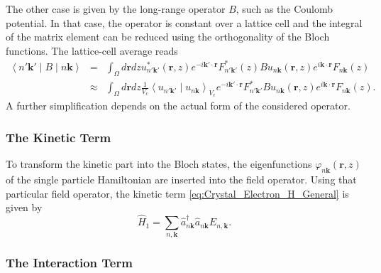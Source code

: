 The other case is given by the long-range operator $B$, such as the
Coulomb potential. In that case, the operator is constant over a lattice
cell and the integral of the matrix element can be reduced using the
orthogonality of the Bloch functions. The lattice-cell average reads\begin{eqnarray}
\left\langle n'\mathbf{k}'\mid B\mid n\mathbf{k}\right\rangle  & = & \int_{\Omega}d\mathbf{r}dzu_{n'\mathbf{k}'}^{*}(\mathbf{r},z)e^{-i\mathbf{k}'\cdot\mathbf{r}}F_{n'\mathbf{k}'}^{*}(z)Bu_{n\mathbf{k}}(\mathbf{r},z)e^{i\mathbf{k}\cdot\mathbf{r}}F_{n\mathbf{k}}(z)\nonumber \\
 & \approx & \int_{\Omega}d\mathbf{r}dz\frac{1}{V_{c}}\left\langle u_{n'\mathbf{k}'}\mid u_{n\mathbf{k}}\right\rangle _{V_{c}}e^{-i\mathbf{k}'\cdot\mathbf{r}}F_{n'\mathbf{k}'}^{*}Bu_{n\mathbf{k}}(\mathbf{r},z)e^{i\mathbf{k}\cdot\mathbf{r}}F_{n\mathbf{k}}(z).\label{eq:Matrix_Element_Lattice_Cell_Average}\end{eqnarray}
A further simplification depends on the actual form of the considered
operator.


\subsubsection{The Kinetic Term}

To transform the kinetic part into the Bloch states, the eigenfunctions
$\varphi_{n\mathbf{k}}(\mathbf{r},z)$ of the single particle Hamiltonian
are inserted into the field operator. Using that particular field
operator, the kinetic term \ref{eq:Crystal_Electron_H_General} is
given by\begin{equation}
\hat{H}_{1}=\sum_{n,\mathbf{k}}\hat{a}_{n\mathbf{k}}^{\dagger}\hat{a}_{n\mathbf{k}}E_{n,\mathbf{k}}.\end{equation}



\subsubsection{The Interaction Term}

